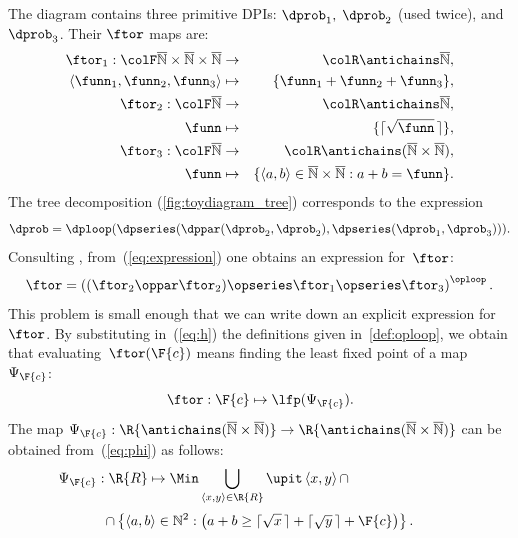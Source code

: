 \noindent The diagram contains three primitive DPIs: $\dprob_{1},$
$\dprob_{2}$ (used twice), and $\dprob_{3}$. Their $\ftor$ maps
are:
\begin{eqnarray*}
\ftor_{1}:{\colF\overline{\mathbb{N}}\times\overline{\mathbb{N}}\times\overline{\mathbb{N}}} & \rightarrow & {\colR\antichains\overline{\mathbb{N}}},\\
\left\langle \funn_{1},\funn_{2},\funn_{3}\right\rangle  & \mapsto & \{\funn_{1}+\funn_{2}+\funn_{3}\},\\
\ftor_{2}:{\colF\overline{\mathbb{N}}} & \rightarrow & {\colR\antichains\overline{\mathbb{N}}},\\
\funn& \mapsto & \{\lceil\sqrt{\funn}\,\rceil\},\\
\ftor_{3}:{\colF\overline{\mathbb{N}}} & \rightarrow & {\colR\antichains(\overline{\mathbb{N}}\times\overline{\mathbb{N}})},\\
\funn& \mapsto & \{\left\langle a,b\right\rangle \in\overline{\mathbb{N}}\times\overline{\mathbb{N}}:a+b=\funn\}.
\end{eqnarray*}
The tree decomposition (\cref{fig:toydiagram_tree}) corresponds to
the expression
\begin{equation}
\dprob=\dploop(\dpseries(\dppar(\dprob_{2},\dprob_{2}),\dpseries(\dprob_{1},\dprob_{3}))).\label{eq:expression}
\end{equation}
Consulting , from~(\ref{eq:expression})
one obtains an expression for~$\ftor$:
\begin{equation}
\ftor=\left((\ftor_{2}\oppar\ftor_{2})\opseries\ftor_{1}\opseries\ftor_{3}\right)^{\oploop}.\label{eq:h}
\end{equation}
This problem is small enough that we can write down an explicit expression
for~$\ftor$. By substituting in~(\ref{eq:h}) the definitions given
in~\textendash \ref{def:oploop}, we obtain that
evaluating~$\ftor(\F{c})$ means finding the least fixed point of
a map~$\Psi_{\F{c}}$: 
\[
\ftor:\F{c}\mapsto\lfp(\Psi_{\F{c}}).
\]
The map $\Psi_{\F{c}}:\R{\antichains(\overline{\mathbb{N}}\times\overline{\mathbb{N}})}\rightarrow\R{\antichains(\overline{\mathbb{N}}\times\overline{\mathbb{N}})}$
can be obtained from~(\ref{eq:phi}) as follows:
\[
\Psi_{\F{c}}:\R{R}\mapsto\Min\bigcup_{\left\langle x,y\right\rangle \in\R{R}}\upit\left\langle x,y\right\rangle \cap\qquad\qquad\qquad\qquad
\]
\[
\cap\left\{ \left\langle a,b\right\rangle \in\mathbb{N}^{2}:\left(a+b\geq\lceil\sqrt{x}\,\rceil+\lceil\sqrt{y}\,\rceil+\F{c}\right)\right\} .
\]

